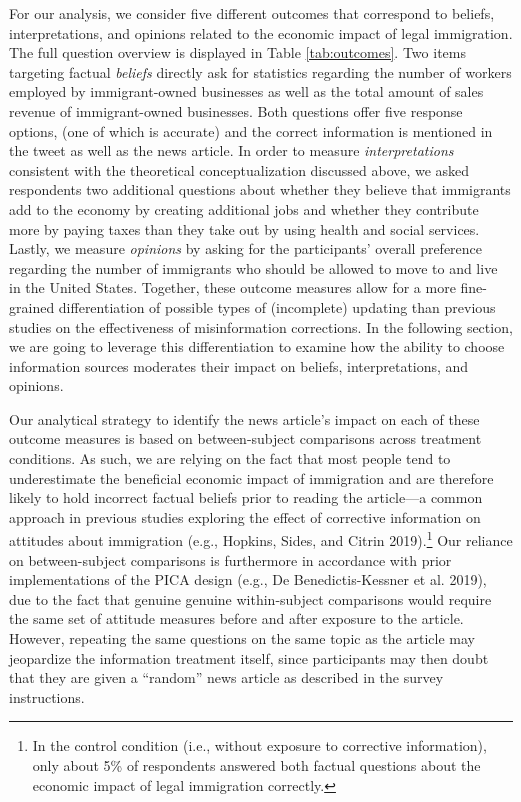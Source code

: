 \documentclass[
  12pt,
]{article}
\begin{document}
For our analysis, we consider five different outcomes that correspond to
beliefs, interpretations, and opinions related to the economic impact of
legal immigration. The full question overview is displayed in Table
\ref{tab:outcomes}. Two items targeting factual \emph{beliefs} directly
ask for statistics regarding the number of workers employed by
immigrant-owned businesses as well as the total amount of sales revenue
of immigrant-owned businesses. Both questions offer five response
options, (one of which is accurate) and the correct information is
mentioned in the tweet as well as the news article. In order to measure
\emph{interpretations} consistent with the theoretical conceptualization
discussed above, we asked respondents two additional questions about
whether they believe that immigrants add to the economy by creating
additional jobs and whether they contribute more by paying taxes than
they take out by using health and social services. Lastly, we measure
\emph{opinions} by asking for the participants' overall preference
regarding the number of immigrants who should be allowed to move to and
live in the United States. Together, these outcome measures allow for a
more fine-grained differentiation of possible types of (incomplete)
updating than previous studies on the effectiveness of misinformation
corrections. In the following section, we are going to leverage this
differentiation to examine how the ability to choose information sources
moderates their impact on beliefs, interpretations, and opinions.

Our analytical strategy to identify the news article's impact on each of
these outcome measures is based on between-subject comparisons across
treatment conditions. As such, we are relying on the fact that most
people tend to underestimate the beneficial economic impact of
immigration and are therefore likely to hold incorrect factual beliefs
prior to reading the article---a common approach in previous studies
exploring the effect of corrective information on attitudes about
immigration (e.g., Hopkins, Sides, and Citrin 2019).\footnote{In the
  control condition (i.e., without exposure to corrective information),
  only about 5\% of respondents answered both factual questions about
  the economic impact of legal immigration correctly.} Our reliance on
between-subject comparisons is furthermore in accordance with prior
implementations of the PICA design (e.g., De Benedictis-Kessner et al.
2019), due to the fact that genuine genuine within-subject comparisons
would require the same set of attitude measures before and after
exposure to the article. However, repeating the same questions on the
same topic as the article may jeopardize the information treatment
itself, since participants may then doubt that they are given a
``random'' news article as described in the survey instructions.
\end{document}
